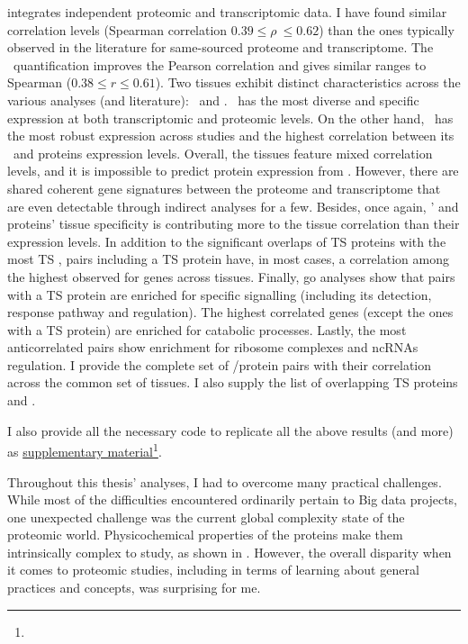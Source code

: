  integrates independent proteomic and transcriptomic data.
I have found similar correlation levels
(Spearman correlation $0.39 ≤ \rho\ ≤ 0.62$)
than the ones typically observed in
the literature for same-sourced proteome and transcriptome.
The \PPKM\ quantification improves the Pearson correlation
and gives similar ranges to Spearman ($0.38 ≤ r ≤ 0.61$).
Two tissues exhibit distinct characteristics across the various analyses
(and literature): \Testis\ and \Liver.
\Testis\ has the most diverse and specific expression
at both transcriptomic and proteomic levels.
On the other hand, \Liver\ has the most robust expression across studies
and the highest correlation between its \mRNAs\ and proteins expression levels.
Overall, the tissues feature mixed correlation levels,
and it is impossible to predict protein expression from \mRNA{}.
However, there are shared coherent gene signatures
between the proteome and transcriptome
that are even detectable through indirect analyses for a few.
Besides, once again,
\mRNAs{}' and proteins' tissue specificity is contributing
more to the tissue correlation than their expression levels.
In addition to the significant overlaps of \gls{TS} proteins
with the most \gls{TS} \mRNAs,
pairs including a \gls{TS} protein have,
in most cases,
a correlation among the highest observed for genes across tissues.
Finally, \gls{go} analyses show that pairs with a \gls{TS} protein
are enriched for specific signalling
(including its detection, response pathway and regulation).
The highest correlated genes (except the ones with a \gls{TS} protein) are
enriched for catabolic processes.
Lastly, the most anticorrelated pairs show enrichment
for ribosome complexes and \glspl{ncRNA} regulation.
I provide the complete set of \mRNA/protein pairs with their correlation
across the common set of tissues.
I also supply the list of overlapping \gls{TS} proteins and \mRNAs{}.

I also provide all the necessary code to replicate all the above results (and more)
as \href{https://github.com/barzine/BaselineAtlas/tree/thesis.}{supplementary
material}\footnote{}.


Throughout this thesis' analyses,
I had to overcome many practical challenges.
While most of the difficulties encountered ordinarily pertain to Big data projects,
one unexpected challenge was
the current global complexity state of the proteomic world.
Physicochemical properties of the proteins make them
intrinsically complex to study,
as shown in .
However, the overall disparity
when it comes to proteomic studies,
including in terms of learning about general practices and concepts,
was surprising for me.

